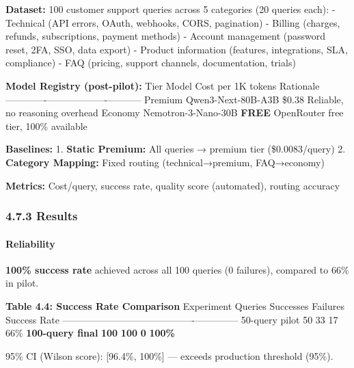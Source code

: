 \documentclass[
]{article}
\begin{document}
\textbf{Dataset:} 100 customer support queries across 5 categories (20
queries each): - Technical (API errors, OAuth, webhooks, CORS,
pagination) - Billing (charges, refunds, subscriptions, payment methods)
- Account management (password reset, 2FA, SSO, data export) - Product
information (features, integrations, SLA, compliance) - FAQ (pricing,
support channels, documentation, trials)

\textbf{Model Registry (post-pilot):} \textbar{} Tier \textbar{} Model
\textbar{} Cost per 1K tokens \textbar{} Rationale \textbar{}
\textbar------\textbar-------\textbar-------------------\textbar-----------\textbar{}
\textbar{} Premium \textbar{} Qwen3-Next-80B-A3B \textbar{} \$0.38
\textbar{} Reliable, no reasoning overhead \textbar{} \textbar{} Economy
\textbar{} Nemotron-3-Nano-30B \textbar{} \textbf{FREE} \textbar{}
OpenRouter free tier, 100\% available \textbar{}

\textbf{Baselines:} 1. \textbf{Static Premium:} All queries → premium
tier (\$0.0083/query) 2. \textbf{Category Mapping:} Fixed routing
(technical→premium, FAQ→economy)

\textbf{Metrics:} Cost/query, success rate, quality score (automated),
routing accuracy

\hypertarget{results-3}{%
\subsubsection{4.7.3 Results}\label{results-3}}

\hypertarget{reliability}{%
\paragraph{Reliability}\label{reliability}}

\textbf{100\% success rate} achieved across all 100 queries (0
failures), compared to 66\% in pilot.

\textbf{Table 4.4: Success Rate Comparison} \textbar{} Experiment
\textbar{} Queries \textbar{} Successes \textbar{} Failures \textbar{}
Success Rate \textbar{}
\textbar------------\textbar---------\textbar-----------\textbar----------\textbar--------------\textbar{}
\textbar{} 50-query pilot \textbar{} 50 \textbar{} 33 \textbar{} 17
\textbar{} 66\% \textbar{} \textbar{} \textbf{100-query final}
\textbar{} \textbf{100} \textbar{} \textbf{100} \textbar{} \textbf{0}
\textbar{} \textbf{100\%} \textbar{}

95\% CI (Wilson score): {[}96.4\%, 100\%{]} --- exceeds production
threshold (95\%).
\end{document}
